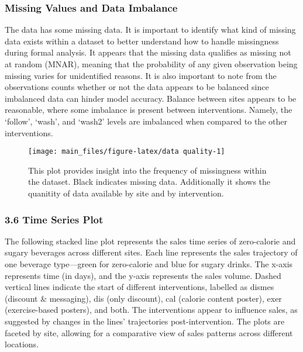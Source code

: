 \documentclass[
]{article}
\begin{document}
\hypertarget{missing-values-and-data-imbalance}{%
\subsubsection{Missing Values and Data
Imbalance}\label{missing-values-and-data-imbalance}}

The data has some missing data. It is important to identify what kind of
missing data exists within a dataset to better understand how to handle
missingness during formal analysis. It appears that the missing data
qualifies as missing not at random (MNAR), meaning that the probability
of any given observation being missing varies for unidentified reasons.
It is also important to note from the observations counts whether or not
the data appears to be balanced since imbalanced data can hinder model
accuracy. Balance between sites appears to be reasonable, where some
imbalance is present between interventions. Namely, the `follow',
`wash', and `wash2' levels are imbalanced when compared to the other
interventions.

\begin{figure}

{\centering \texttt{[image: main\_files/figure-latex/data quality-1]} 

}

\caption{This plot provides insight into the frequency of missingness within the dataset. Black indicates missing data. Additionally it shows the quanitity of data available by site and by intervention.}\label{fig:data quality}
\end{figure}

\hypertarget{time-series-plot}{%
\subsubsection{3.6 Time Series Plot}\label{time-series-plot}}

The following stacked line plot represents the sales time series of
zero-calorie and sugary beverages across different sites. Each line
represents the sales trajectory of one beverage type---green for
zero-calorie and blue for sugary drinks. The x-axis represents time (in
days), and the y-axis represents the sales volume. Dashed vertical lines
indicate the start of different interventions, labelled as dismes
(discount \& messaging), dis (only discount), cal (calorie content
poster), exer (exercise-based posters), and both. The interventions
appear to influence sales, as suggested by changes in the lines'
trajectories post-intervention. The plots are faceted by site, allowing
for a comparative view of sales patterns across different locations.
\end{document}
